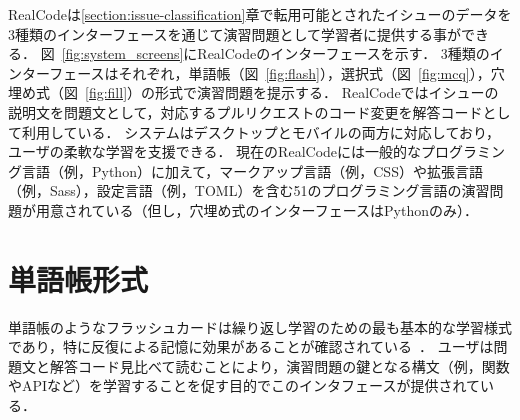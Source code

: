 RealCodeは\ref{section:issue-classification}章で転用可能とされたイシューのデータを3種類のインターフェースを通じて演習問題として学習者に提供する事ができる．
図~\ref{fig:system_screens}にRealCodeのインターフェースを示す．
3種類のインターフェースはそれぞれ，単語帳（図~\ref{fig:flash}），選択式（図~\ref{fig:mcq}），穴埋め式（図~\ref{fig:fill}）の形式で演習問題を提示する．
RealCodeではイシューの説明文を問題文として，対応するプルリクエストのコード変更を解答コードとして利用している．
システムはデスクトップとモバイルの両方に対応しており，ユーザの柔軟な学習を支援できる\cite{gassler2004integrated}．
現在のRealCodeには一般的なプログラミング言語（例，Python）に加えて，マークアップ言語（例，CSS）や拡張言語（例，Sass），設定言語（例，TOML）を含む51のプログラミング言語の演習問題が用意されている（但し，穴埋め式のインターフェースはPythonのみ）．



\section{単語帳形式}

単語帳のようなフラッシュカードは繰り返し学習のための最も基本的な学習様式であり，特に反復による記憶に効果があることが確認されている~\cite{macquarrie2002comparison}．
ユーザは問題文と解答コード見比べて読むことにより，演習問題の鍵となる構文（例，関数やAPIなど）を学習することを促す目的でこのインタフェースが提供されている．


